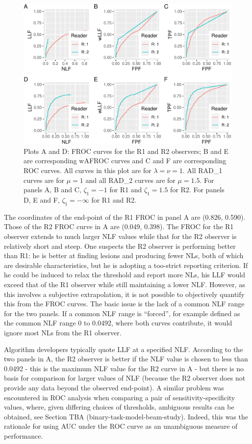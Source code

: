 \documentclass[
]{book}
\begin{document}
\begin{figure}
\centering
\includegraphics{13c-froc-vs-wafroc_files/figure-latex/froc-vs-wafroc-plot1-1.pdf}
\caption{\label{fig:froc-vs-wafroc-plot1}Plots A and D: FROC curves for the R1 and R2 observers; B and E are corresponding wAFROC curves and C and F are corresponding ROC curves. All curves in this plot are for \(\lambda = \nu = 1\). All RAD\_1 curves are for \(\mu = 1\) and all RAD\_2 curves are for \(\mu = 1.5\). For panels A, B and C, \(\zeta_1 = -1\) for R1 and \(\zeta_1 = 1.5\) for R2. For panels D, E and F, \(\zeta_1 = -\infty\) for R1 and R2.}
\end{figure}

The coordinates of the end-point of the R1 FROC in panel A are (0.826, 0.590). Those of the R2 FROC curve in A are (0.049, 0.398). The FROC for the R1 observer extends to much larger NLF values while that for the R2 observer is relatively short and steep. One suspects the R2 observer is performing better than R1: he is better at finding lesions and producing fewer NLs, both of which are desirable characteristics, but he is adopting a too-strict reporting criterion. If he could be induced to relax the threshold and report more NLs, his LLF would exceed that of the R1 observer while still maintaining a lower NLF. However, as this involves a subjective extrapolation, it is not possible to objectively quantify this from the FROC curves. The basic issue is the lack of a common NLF range for the two panels. If a common NLF range is ``forced'', for example defined as the common NLF range 0 to 0.0492, where both curves contribute, it would ignore most NLs from the R1 observer.

Algorithm developers typically quote LLF at a specified NLF. According to the two panels in A, the R2 observer is better if the NLF value is chosen to less than 0.0492 - this is the maximum NLF value for the R2 curve in A - but there is no basis for comparison for larger values of NLF (because the R2 observer does not provide any data beyond the observed end-point). A similar problem was encountered in ROC analysis when comparing a pair of sensitivity-specificity values, where, given differing choices of thresholds, ambiguous results can be obtained, see Section TBA (binary-task-model-beam-study). Indeed, this was the rationale for using AUC under the ROC curve as an unambiguous measure of performance.
\end{document}
